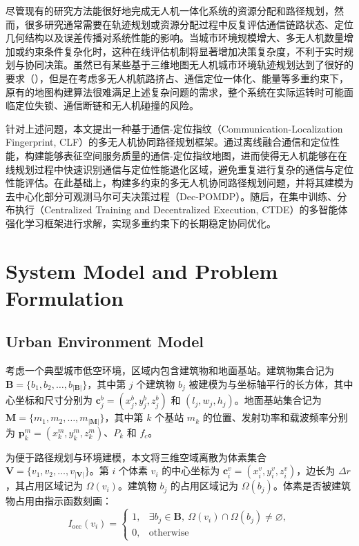 \documentclass[lettersize,journal]{IEEEtran}
\begin{document}
尽管现有的研究方法能很好地完成无人机一体化系统的资源分配和路径规划，然而，很多研究通常需要在轨迹规划或资源分配过程中反复评估通信链路状态、定位几何结构以及误差传播对系统性能的影响。当城市环境规模增大、多无人机数量增加或约束条件复杂化时，这种在线评估机制将显著增加决策复杂度，不利于实时规划与协同决策。虽然已有某些基于三维地图无人机城市环境轨迹规划达到了很好的要求（\cite{ref13,ref14,ref15}），但是在考虑多无人机航路挤占、通信定位一体化、能量等多重约束下，原有的地图构建算法很难满足上述复杂问题的需求，整个系统在实际运转时可能面临定位失锁、通信断链和无人机碰撞的风险。

针对上述问题，本文提出一种基于通信-定位指纹（Communication-Localization Fingerprint, CLF）的多无人机协同路径规划框架。通过离线融合通信和定位性能，构建能够表征空间服务质量的通信-定位指纹地图，进而使得无人机能够在在线规划过程中快速识别通信与定位性能退化区域，避免重复进行复杂的通信与定位性能评估。在此基础上，构建多约束的多无人机协同路径规划问题，并将其建模为去中心化部分可观测马尔可夫决策过程（Dec-POMDP）。随后，在集中训练、分布执行（Centralized Training and Decentralized Execution, CTDE）的多智能体强化学习框架进行求解，实现多重约束下的长期稳定协同优化。

\section{System Model and Problem Formulation}

\subsection{Urban Environment Model}

考虑一个典型城市低空环境，区域内包含建筑物和地面基站。建筑物集合记为
$\mathbf{B}=\{b_1,b_2,\ldots,b_{|\mathbf{B}|}\}$，其中第 $j$ 个建筑物 $b_j$ 被建模为与坐标轴平行的长方体，其中心坐标和尺寸分别为
$\mathbf{c}_j^b=(x_j^b,y_j^b,z_j^b)$ 和 $(l_j,w_j,h_j)$。地面基站集合记为
$\mathbf{M}=\{m_1,m_2,\ldots,m_{|\mathbf{M}|}\}$，其中第 $k$ 个基站 $m_k$ 的位置、发射功率和载波频率分别为
$\mathbf{p}_k^m=(x_k^m,y_k^m,z_k^m)$、$P_k$ 和 $f_c$。

为便于路径规划与环境建模，本文将三维空域离散为体素集合
$\mathbf{V}=\{v_1,v_2,\ldots,v_{|\mathbf{V}|}\}$。第 $i$ 个体素 $v_i$ 的中心坐标为
$\mathbf{c}_i^v=(x_i^v,y_i^v,z_i^v)$，边长为 $\Delta r$，其占用区域记为 $\Omega(v_i)$。建筑物 $b_j$ 的占用区域记为 $\Omega(b_j)$。体素是否被建筑物占用由指示函数刻画：
\begin{equation}
I_{\mathrm{occ}}(v_i)=
\begin{cases}
1, & \exists b_j\in\mathbf{B},\ \Omega(v_i)\cap\Omega(b_j)\neq\varnothing,\\
0, & \mathrm{otherwise}
\end{cases}
\end{equation}
\end{document}
